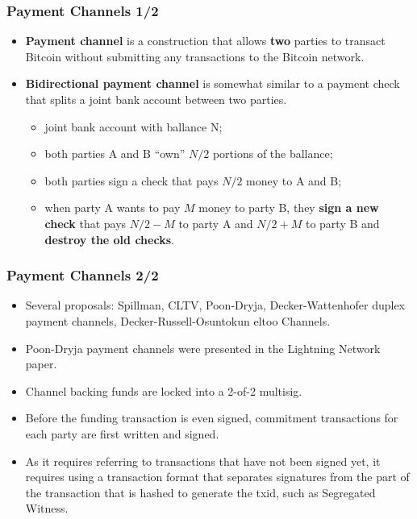 \documentclass{beamer}
\begin{document}
\begin{frame}
  \frametitle{Payment Channels 1/2}
  \begin{itemize}
  \item \textbf{Payment channel} is a construction that allows \textbf{two}
    parties to transact Bitcoin without submitting any transactions to the
    Bitcoin network.
  \item \textbf{Bidirectional payment channel} is somewhat similar to a payment
    check that splits a joint bank account between two parties.
    \begin{itemize}
    \item joint bank account with ballance N;
    \item both parties A and B ``own'' $N/2$ portions of the ballance;
    \item both parties sign a check that pays $N/2$ money to A and B;
    \item when party A wants to pay $M$ money to party B, they \textbf{sign a
        new check} that pays $N/2 - M$ to party A and $N/2 + M$ to party B and
      \textbf{destroy the old checks}.
    \end{itemize}
  \end{itemize}
\end{frame}

\begin{frame}
  \frametitle{Payment Channels 2/2}
  \begin{itemize}
  \item Several proposals: Spillman, CLTV, Poon-Dryja, Decker-Wattenhofer duplex
    payment channels, Decker-Russell-Osuntokun eltoo Channels.
  \item Poon-Dryja payment channels were presented in the Lightning Network
    paper.
  \item Channel backing funds are locked into a 2-of-2 multisig.
  \item Before the funding transaction is even signed, commitment transactions
    for each party are first written and signed.
  \item As it requires referring to transactions that have not been signed yet,
    it requires using a transaction format that separates signatures from the
    part of the transaction that is hashed to generate the txid, such as
    Segregated Witness.
  \end{itemize}
\end{frame}
\end{document}
